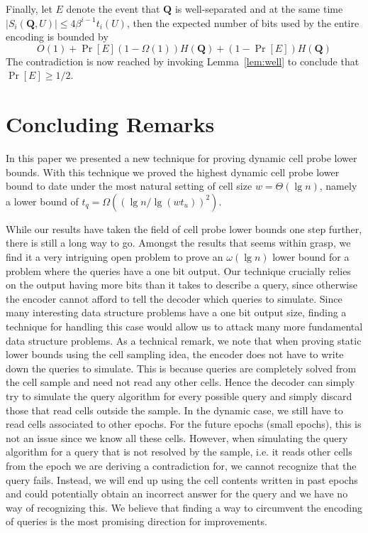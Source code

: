\documentclass[letterpaper]{article}
\newcommand{\Q}{\textbf{Q}}
\begin{document}
Finally, let $E$ denote the event that $\Q$ is well-separated and at
the same time $|S_i(\Q,U)|\leq 4 \beta^{i-1} t_i(U)$, then the
expected number of bits used by the entire encoding is bounded by
\[
O(1)+\Pr[E](1-\Omega(1))H(\Q)+(1-\Pr[E])H(\Q)
\]
The contradiction is now reached by invoking Lemma~\ref{lem:well} to
conclude that $\Pr[E]\geq 1/2$.






\section{Concluding Remarks}
\label{sec:conclude}
In this paper we presented a new technique for proving dynamic cell
probe lower bounds. With this technique we proved the highest dynamic
cell probe lower bound to date under the most natural setting of cell
size $w=\Theta(\lg n)$, namely a lower bound of $t_q=\Omega((\lg
n/\lg(wt_u))^2)$.

While our results have taken the field of cell probe lower bounds one
step further, there is still a long way to go. Amongst the results
that seems within grasp, we find it a very intriguing open problem to
prove an $\omega(\lg n)$ lower bound for a problem where the queries
have a one bit output. Our technique crucially relies on the output
having more bits than it takes to describe a query, since otherwise
the encoder cannot afford to tell the decoder which queries to
simulate. Since many interesting data structure problems have a one
bit output size, finding a technique for handling this case would
allow us to attack many more fundamental data structure problems. As a
technical remark, we note that when proving static lower bounds using
the cell sampling idea, the encoder does not have to write down the
queries to simulate. This is because queries are completely solved
from the cell sample and need not read any other cells. Hence the
decoder can simply try to simulate the query algorithm for every
possible query and simply discard those that read cells outside the
sample. In the dynamic case, we still have to read cells associated to
other epochs. For the future epochs (small epochs), this is not an
issue since we know all these cells. However, when simulating the
query algorithm for a query that is not resolved by the sample,
i.e. it reads other cells from the epoch we are deriving a
contradiction for, we cannot recognize that the query fails. Instead,
we will end up using the cell contents written in past epochs and
could potentially obtain an incorrect answer for the query and we have
no way of recognizing this. We believe that finding a way to
circumvent the encoding of queries is the most promising direction for
improvements.
\end{document}
